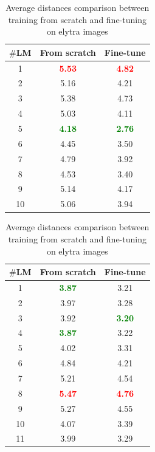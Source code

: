 \documentclass[review]{elsarticle}
\begin{document}
\begin{table}
	\begin{minipage}[t]{0.45\textwidth}
		\centering
		\begin{tabular}{|c|c|c|}
		\hline
		\textbf{$\#$LM} & \textbf{From scratch} & \textbf{Fine-tune} \\ \hline
		1 & \textcolor{red}{\textbf{5.53}} & \textcolor{red}{\textbf{4.82}}\\ \hline
		2 & 5.16 & 4.21 \\ \hline
		3 & 5.38  & 4.73 \\ \hline
		4 & 5.03  & 4.11 \\ \hline
		5 & \textcolor{green}{\textbf{4.18}}  & \textcolor{green}{\textbf{2.76}}\\ \hline
		6 & 4.45  & 3.50 \\ \hline
		7 & 4.79  & 3.92 \\ \hline
		8 & 4.53  & 3.40\\ \hline
		9 & 5.14  & 4.17 \\ \hline
		10 & 5.06  & 3.94\\ \hline
	\end{tabular}
	\caption{Average distances comparison between training from scratch and fine-tuning on head images}
	\label{cmptete}
	\end{minipage}
	\hfill
	\begin{minipage}[t]{0.45\textwidth}
		\centering
		\begin{tabular}{|c|c|c|}
			\hline
			\textbf{$\#$LM} & \textbf{From scratch} & \textbf{Fine-tune} \\ \hline
			1 & \textcolor{green}{\textbf{3.87}} & 3.21  \\ \hline
			2 & 3.97 & 3.28 \\ \hline
			3 & 3.92  & \textcolor{green}{\textbf{3.20}}\\ \hline
			4 & \textcolor{green}{\textbf{3.87}}  & 3.22 \\ \hline
			5 & 4.02  & 3.31 \\ \hline
			6 & 4.84  & 4.21\\ \hline
			7 & 5.21  & 4.54 \\ \hline
			8 & \textcolor{red}{\textbf{5.47}}  & \textcolor{red}{\textbf{4.76}}\\ \hline
			9 & 5.27  & 4.55 \\ \hline
			10 & 4.07  & 3.39 \\ \hline
			11 & 3.99  & 3.29 \\ \hline
		\end{tabular}
		\caption{Average distances comparison between training from scratch and fine-tuning on elytra images}
		\label{cmpelytre}
	\end{minipage}
\end{table}
\end{document}
